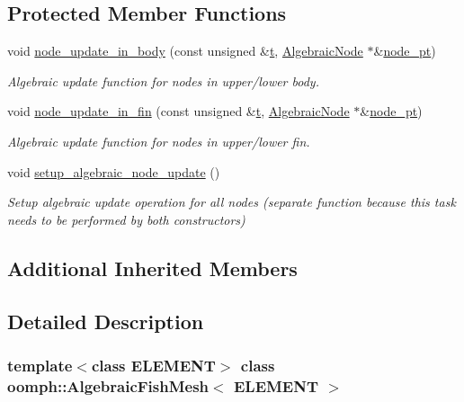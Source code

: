 \subsection*{Protected Member Functions}
\begin{DoxyCompactItemize}
\item 
void \hyperlink{classoomph_1_1AlgebraicFishMesh_a4aee83d1b0a42418fe886b2f244c1d49}{node\+\_\+update\+\_\+in\+\_\+body} (const unsigned \&\hyperlink{cfortran_8h_af6f0bd3dc13317f895c91323c25c2b8f}{t}, \hyperlink{classoomph_1_1AlgebraicNode}{Algebraic\+Node} $\ast$\&\hyperlink{classoomph_1_1AlgebraicMesh_aedeebbe95d2f8e67e9939cecd1be3933}{node\+\_\+pt})
\begin{DoxyCompactList}\small\item\em Algebraic update function for nodes in upper/lower body. \end{DoxyCompactList}\item 
void \hyperlink{classoomph_1_1AlgebraicFishMesh_ad4a6f95e21e3d81b9defde90636e7d45}{node\+\_\+update\+\_\+in\+\_\+fin} (const unsigned \&\hyperlink{cfortran_8h_af6f0bd3dc13317f895c91323c25c2b8f}{t}, \hyperlink{classoomph_1_1AlgebraicNode}{Algebraic\+Node} $\ast$\&\hyperlink{classoomph_1_1AlgebraicMesh_aedeebbe95d2f8e67e9939cecd1be3933}{node\+\_\+pt})
\begin{DoxyCompactList}\small\item\em Algebraic update function for nodes in upper/lower fin. \end{DoxyCompactList}\item 
void \hyperlink{classoomph_1_1AlgebraicFishMesh_a1a6d22eedc77299d843274e8ce34b560}{setup\+\_\+algebraic\+\_\+node\+\_\+update} ()
\begin{DoxyCompactList}\small\item\em Setup algebraic update operation for all nodes (separate function because this task needs to be performed by both constructors) \end{DoxyCompactList}\end{DoxyCompactItemize}
\subsection*{Additional Inherited Members}


\subsection{Detailed Description}
\subsubsection*{template$<$class E\+L\+E\+M\+E\+NT$>$\newline
class oomph\+::\+Algebraic\+Fish\+Mesh$<$ E\+L\+E\+M\+E\+N\+T $>$}


